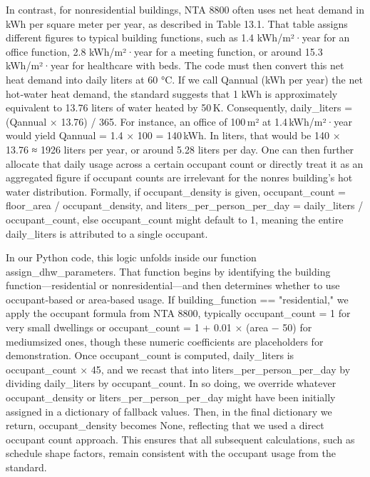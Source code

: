 In contrast, for nonresidential buildings, NTA 8800 often uses net heat demand in kWh per square meter per year, as described in Table 13.1. That table assigns different figures to typical building functions, such as 1.4 kWh/m²·year for an office function, 2.8 kWh/m²·year for a meeting function, or around 15.3 kWh/m²·year for healthcare with beds. The code must then convert this net heat demand into daily liters at 60 °C. If we call Qannual (kWh per year) the net hot‐water heat demand, the standard suggests that 1 kWh is approximately equivalent to 13.76 liters of water heated by 50 K. Consequently, daily_liters = (Qannual × 13.76) / 365. For instance, an office of 100 m² at 1.4 kWh/m²·year would yield Qannual = 1.4 × 100 = 140 kWh. In liters, that would be 140 × 13.76 ≈ 1926 liters per year, or around 5.28 liters per day. One can then further allocate that daily usage across a certain occupant count or directly treat it as an aggregated figure if occupant counts are irrelevant for the nonres building’s hot water distribution. Formally, if occupant_density is given, occupant_count = floor_area / occupant_density, and liters_per_person_per_day = daily_liters / occupant_count, else occupant_count might default to 1, meaning the entire daily_liters is attributed to a single occupant.

In our Python code, this logic unfolds inside our function assign_dhw_parameters. That function begins by identifying the building function—residential or nonresidential—and then determines whether to use occupant‐based or area‐based usage. If building_function == "residential," we apply the occupant formula from NTA 8800, typically occupant_count = 1 for very small dwellings or occupant_count = 1 + 0.01 × (area − 50) for mediumsized ones, though these numeric coefficients are placeholders for demonstration. Once occupant_count is computed, daily_liters is occupant_count × 45, and we recast that into liters_per_person_per_day by dividing daily_liters by occupant_count. In so doing, we override whatever occupant_density or liters_per_person_per_day might have been initially assigned in a dictionary of fallback values. Then, in the final dictionary we return, occupant_density becomes None, reflecting that we used a direct occupant count approach. This ensures that all subsequent calculations, such as schedule shape factors, remain consistent with the occupant usage from the standard. 

